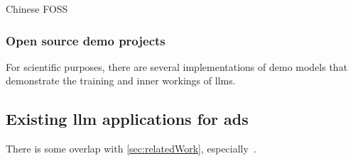 Chinese  FOSS

\subsubsection{Open source demo projects}

For scientific purposes, there are several implementations of demo models that demonstrate the
training and inner workings of \acrshort{llms}.



\subsection{Existing \acrshort{llm} applications for \acrshort{ads}}

There is some overlap with \cref{sec:relatedWork}, especially~\cite{autoSceneGen}.

